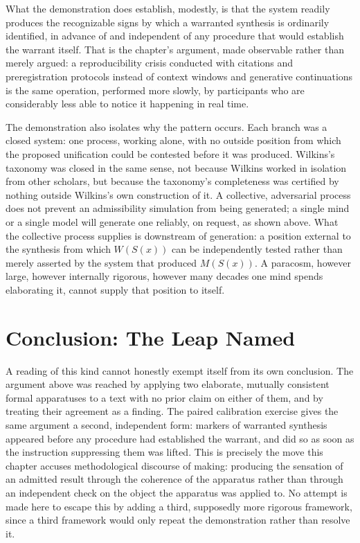 What the demonstration does establish, modestly, is that the system readily produces the recognizable signs by which a warranted synthesis is ordinarily identified, in advance of and independent of any procedure that would establish the warrant itself. That is the chapter's argument, made observable rather than merely argued: a reproducibility crisis conducted with citations and preregistration protocols instead of context windows and generative continuations is the same operation, performed more slowly, by participants who are considerably less able to notice it happening in real time.

The demonstration also isolates why the pattern occurs. Each branch was a closed system: one process, working alone, with no outside position from which the proposed unification could be contested before it was produced. Wilkins's taxonomy was closed in the same sense, not because Wilkins worked in isolation from other scholars, but because the taxonomy's completeness was certified by nothing outside Wilkins's own construction of it. A collective, adversarial process does not prevent an admissibility simulation from being generated; a single mind or a single model will generate one reliably, on request, as shown above. What the collective process supplies is downstream of generation: a position external to the synthesis from which $W(S(x))$ can be independently tested rather than merely asserted by the system that produced $M(S(x))$. A paracosm, however large, however internally rigorous, however many decades one mind spends elaborating it, cannot supply that position to itself.

\section{Conclusion: The Leap Named}

A reading of this kind cannot honestly exempt itself from its own conclusion. The argument above was reached by applying two elaborate, mutually consistent formal apparatuses to a text with no prior claim on either of them, and by treating their agreement as a finding. The paired calibration exercise gives the same argument a second, independent form: markers of warranted synthesis appeared before any procedure had established the warrant, and did so as soon as the instruction suppressing them was lifted. This is precisely the move this chapter accuses methodological discourse of making: producing the sensation of an admitted result through the coherence of the apparatus rather than through an independent check on the object the apparatus was applied to. No attempt is made here to escape this by adding a third, supposedly more rigorous framework, since a third framework would only repeat the demonstration rather than resolve it.

